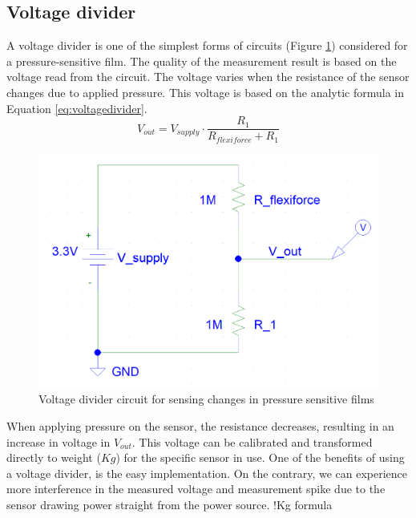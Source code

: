 \subsection{Voltage divider}
A voltage divider is one of the simplest forms of circuits (Figure \ref{fig:voltagedivider}) considered for a pressure-sensitive film. The quality of the measurement result is based on the voltage read from the circuit. The voltage varies when the resistance of the sensor changes due to applied pressure. This voltage is based on the analytic formula in Equation \ref{eq:voltagedivider}. 
\begin{equation}
\label{eq:voltagedivider}
    V_{out} = V_{supply} \cdot \frac{R_1}{R_{flexiforce} + R_1}
\end{equation}
\begin{figure}[!b]
    \centering
    \includegraphics[scale=0.45]{figures/voltage_divider.png}
    \caption{Voltage divider circuit for sensing changes in pressure sensitive films}
    \label{fig:voltagedivider}
\end{figure}
When applying pressure on the sensor, the resistance decreases, resulting in an increase in voltage in $V_{out}$. This voltage can be calibrated and transformed directly to weight ($Kg$) for the specific sensor in use. One of the benefits of using a voltage divider, is the easy implementation. On the contrary, we can experience more interference in the measured voltage and measurement spike due to the sensor drawing power straight from the power source. !Kg formula

